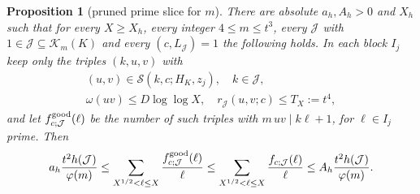 \documentclass[10pt,reqno]{amsart}
\newtheorem{proposition}[theorem]{Proposition}
\theoremstyle{definition}
\newcommand{\K}{\mathcal K}
\newcommand{\J}{\mathcal J}
\newcommand{\Sset}{\mathcal S}
\begin{document}
\begin{proposition}[pruned prime slice for $m$]\label{prop:harvest}
There are absolute $a_h,A_h>0$ and $X_h$ such that for every $X\geq X_h$,
every integer $4\leq m\leq t^3$, every $\J$ with
$1\in\J\subseteq\K_m(K)$ and every $(c,L_{\J})=1$ the following holds.
In each block $I_j$ keep only the triples $(k,u,v)$ with
\begin{equation}\label{eq:pruning}
 \begin{gathered}
 (u,v)\in\Sset(k,c;H_K,z_j),\quad k\in\J,\\
 \omega(uv)\leq D\log\log X,\quad r_{\J}(u,v;c)\leq T_X:=t^4,
 \end{gathered}
\end{equation}
and let $f^{\rm good}_{c;\J}(\ell)$ be the number of such triples with
$m\,uv\mid k\ell+1$, for $\ell\in I_j$ prime.  Then
\[
 a_h\frac{t^2h(\J)}{\varphi(m)}\leq\sum_{X^{1/2}<\ell\leq X}
 \frac{f^{\rm good}_{c;\J}(\ell)}\ell
 \leq\sum_{X^{1/2}<\ell\leq X}\frac{f_{c;\J}(\ell)}\ell
 \leq A_h\frac{t^2h(\J)}{\varphi(m)}.
\]
\end{proposition}
\end{document}
